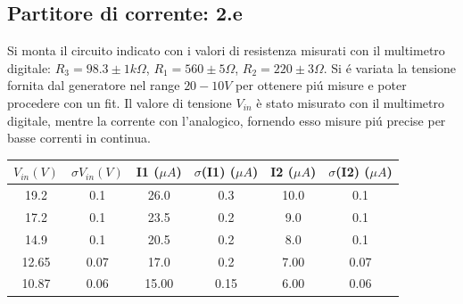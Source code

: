\documentclass[10pt,a4paper]{article}
\begin{document}
\subsection{Partitore di corrente: 2.e}

Si monta il circuito indicato con i valori di resistenza misurati con il multimetro digitale: 
$R_3= 98.3\pm 1 k\Omega$, $R_1 = 560\pm 5 \Omega$, $R_2 = 220\pm 3 \Omega$.
Si \'e variata la tensione fornita dal generatore nel range $20-10 V$ per ottenere pi\'u misure e poter procedere con un fit.
Il valore di tensione $V_{in}$ è stato misurato con il multimetro digitale, mentre la corrente con l'analogico, fornendo esso misure pi\'u precise per basse correnti in continua.\\
 

\begin{center}
\begin{tabular}{|c|c|c|c|c|c|}
\hline 
$V_{in} (V)$ & $\sigma V_{in} (V)$& I1 ($\mu A$)& $\sigma$(I1) ($\mu A$) & I2	($\mu A$) & $\sigma$(I2) ($\mu A$)  \\
\hline 
19.2 & 0.1 & 26.0 & 0.3 & 10.0 & 0.1 \\
17.2 & 0.1 & 23.5 & 0.2 & 9.0 & 0.1 \\
14.9 & 0.1 & 20.5 & 0.2 & 8.0 & 0.1 \\
12.65 & 0.07 & 17.0 & 0.2 & 7.00 & 0.07 \\
10.87 & 0.06 & 15.00 & 0.15 & 6.00 & 0.06 \\
\hline 
\end{tabular} 
\end{center}
\end{document}
